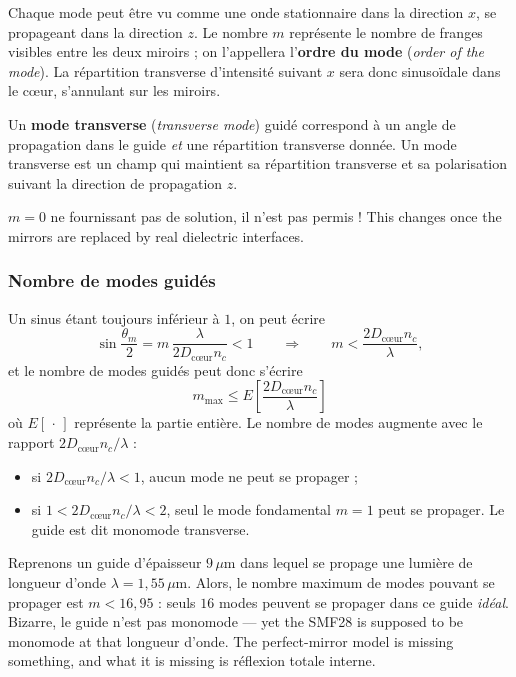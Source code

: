 Chaque mode peut être vu comme une onde stationnaire dans la direction $x$, se
propageant dans la direction $z$. Le nombre $m$ représente le nombre de franges
visibles entre les deux miroirs ; on l'appellera l'\textbf{ordre du mode}
(\textit{order of the mode}). La répartition transverse d'intensité suivant $x$
sera donc sinusoïdale dans le cœur, s'annulant sur les miroirs.

\begin{definition}
  Un \textbf{mode transverse} (\textit{transverse mode}) guidé correspond à un
  angle de propagation dans le guide \emph{et} une répartition transverse
  donnée. Un mode transverse est un champ qui maintient sa répartition
  transverse et sa polarisation suivant la direction de propagation $z$.
\end{definition}

\begin{remark}
  $m = 0$ ne fournissant pas de solution, il n'est pas permis ! This changes
  once the mirrors are replaced by real dielectric interfaces.
\end{remark}

\subsubsection{Nombre de modes guidés}
Un sinus étant toujours inférieur à $1$, on peut écrire
\begin{equation*}
  \sin\frac{\theta_m}{2} = m\,\frac{\lambda}{2D_{\text{cœur}}n_c} < 1
  \qquad\Longrightarrow\qquad
  m < \frac{2D_{\text{cœur}}n_c}{\lambda},
\end{equation*}
et le nombre de modes guidés peut donc s'écrire
\begin{equation*}
  \boxed{\;m_{\max} \le E\!\left[\frac{2D_{\text{cœur}}n_c}{\lambda}\right]\;}
\end{equation*}
où $E[\,\cdot\,]$ représente la partie entière. Le nombre de modes augmente
avec le rapport $2D_{\text{cœur}}n_c/\lambda$ :
\begin{itemize}
  \item si $2D_{\text{cœur}}n_c/\lambda < 1$, aucun mode ne peut se propager ;
  \item si $1 < 2D_{\text{cœur}}n_c/\lambda < 2$, seul le mode fondamental
    $m = 1$ peut se propager. Le guide est dit monomode transverse.
\end{itemize}

\begin{example}
  Reprenons un guide d'épaisseur $9\,\mu$m dans lequel se propage une lumière
  de longueur d'onde $\lambda = 1{,}55\,\mu$m. Alors, le nombre maximum de
  modes pouvant se propager est $m < 16{,}95$ : seuls $16$ modes peuvent se
  propager dans ce guide \emph{idéal}. Bizarre, le guide n'est pas monomode ---
  yet the SMF28 is supposed to be monomode at that longueur d'onde. The
  perfect-mirror model is missing something, and what it is missing is
  réflexion totale interne.
\end{example}

